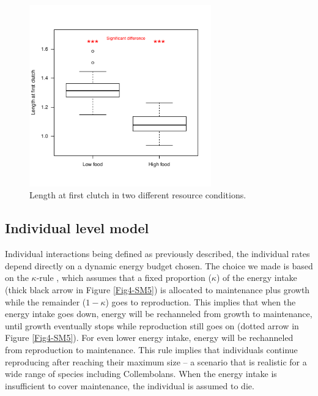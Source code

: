 \begin{figure}[!ht] %
\centering
\includegraphics[width=0.7\textwidth]{4_ChapThe1/Fig/FigSM4.pdf}
\caption[Experimental measure of
length at maturity]{Length at first clutch in two different resource
conditions.}
\label{Fig4-SM4}
\end{figure}

\subsection{Individual level model}\label{subsec:SupMat2}

Individual interactions being defined as previously described, the individual
rates depend directly on a dynamic energy budget chosen. The choice we made is
based on the $\kappa$-rule \autocite[][Figure
\ref{Fig4-SM5}]{kooijman1984a,de-roos1997a}, which assumes that a fixed
proportion ($\kappa$) of the energy intake (thick black arrow in Figure
\ref{Fig4-SM5}) is allocated to maintenance plus growth while the remainder
($1-\kappa$) goes to reproduction. This implies that when the energy intake goes
down, energy will be rechanneled from growth to maintenance, until growth eventually stops while
reproduction still goes on (dotted arrow in Figure \ref{Fig4-SM5}). For even lower energy
intake, energy will be rechanneled from reproduction to maintenance. This rule
implies that individuals continue reproducing after reaching their maximum size
-- a scenario that is realistic for a wide range of species including
Collembolans. When the energy intake is insufficient to cover maintenance, the
individual is assumed to die.

